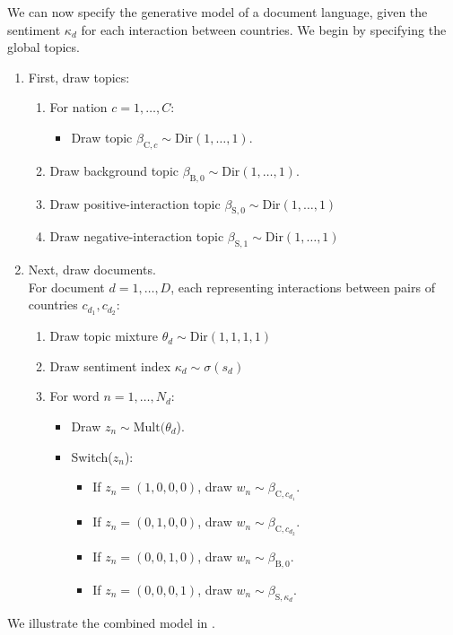We can now specify the generative model of a document language, given
the sentiment $\kappa_d$ for each interaction between countries.  We
begin by specifying the global topics.
\begin{enumerate}
\item First, draw topics:
  \begin{enumerate}
  \item For nation $c=1, \ldots, C$:
    \begin{itemize}
    \item Draw topic $\beta_{\mbox{C},c} \sim \mbox{Dir}(1, \ldots, 1)$.
    \end{itemize}
  \item Draw background topic $\beta_{\mbox{B},0} \sim \mbox{Dir}(1, \ldots, 1)$.
  \item Draw positive-interaction topic $\beta_{\mbox{S},0} \sim \mbox{Dir}(1, \ldots, 1)$
  \item Draw negative-interaction topic $\beta_{\mbox{S},1} \sim \mbox{Dir}(1, \ldots, 1)$
\end{enumerate}

\item Next, draw documents. \\
For document $d=1, \ldots, D$, each representing interactions between pairs of countries $c_{d_1},c_{d_2}$:
  \begin{enumerate}
    \item Draw topic mixture $\theta_d \sim \mbox{Dir}(1, 1, 1, 1)$
    \item Draw sentiment index $\kappa_d \sim \sigma(s_d)$
    \item For word $n = 1, \ldots, N_d$:
    \begin{itemize}
      \item Draw $z_{n} \sim \mbox{Mult}(\theta_d$).
      \item Switch($z_n$):
      \begin{itemize}
        \item If $z_n = (1, 0, 0, 0)$, draw $w_n \sim \beta_{\mbox{C},c_{d_1}}$.
        \item If $z_n = (0, 1, 0, 0)$, draw $w_n \sim \beta_{\mbox{C},c_{d_2}}$.
        \item If $z_n = (0, 0, 1, 0)$, draw $w_n \sim \beta_{\mbox{B},0}$.
        \item If $z_n = (0, 0, 0, 1)$, draw $w_n \sim \beta_{\mbox{S},\kappa_d}$.
      \end{itemize}
    \end{itemize}
  \end{enumerate}
\end{enumerate}
We illustrate the combined model in
.

